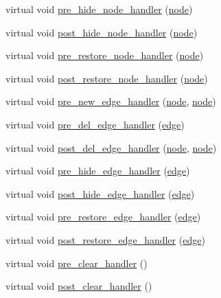 \begin{DoxyCompactItemize}
\item 
virtual void \mbox{\hyperlink{classgraph_ac169b1dca0b01c97e683302b3908fd49}{pre\+\_\+hide\+\_\+node\+\_\+handler}} (\mbox{\hyperlink{classnode}{node}})
\item 
virtual void \mbox{\hyperlink{classgraph_a50cb72a1e81d0a3d68965a1e6070edb3}{post\+\_\+hide\+\_\+node\+\_\+handler}} (\mbox{\hyperlink{classnode}{node}})
\item 
virtual void \mbox{\hyperlink{classgraph_a3a305d240ab5237a2adae315b50105a6}{pre\+\_\+restore\+\_\+node\+\_\+handler}} (\mbox{\hyperlink{classnode}{node}})
\item 
virtual void \mbox{\hyperlink{classgraph_a2d555506de6aa30bb981f0b60375762d}{post\+\_\+restore\+\_\+node\+\_\+handler}} (\mbox{\hyperlink{classnode}{node}})
\item 
virtual void \mbox{\hyperlink{classgraph_a0a7a68fa0baa47ef955525c445fa1a04}{pre\+\_\+new\+\_\+edge\+\_\+handler}} (\mbox{\hyperlink{classnode}{node}}, \mbox{\hyperlink{classnode}{node}})
\item 
virtual void \mbox{\hyperlink{classgraph_a2cd0986dc5bcbfdbf0635c39e610784b}{pre\+\_\+del\+\_\+edge\+\_\+handler}} (\mbox{\hyperlink{classedge}{edge}})
\item 
virtual void \mbox{\hyperlink{classgraph_ab9ac8bcc7288986de69cd467beb33600}{post\+\_\+del\+\_\+edge\+\_\+handler}} (\mbox{\hyperlink{classnode}{node}}, \mbox{\hyperlink{classnode}{node}})
\item 
virtual void \mbox{\hyperlink{classgraph_aa33201befa6ad7433becd7424d6de55b}{pre\+\_\+hide\+\_\+edge\+\_\+handler}} (\mbox{\hyperlink{classedge}{edge}})
\item 
virtual void \mbox{\hyperlink{classgraph_ad4614e74a125054eb3e180f6f32ab7bb}{post\+\_\+hide\+\_\+edge\+\_\+handler}} (\mbox{\hyperlink{classedge}{edge}})
\item 
virtual void \mbox{\hyperlink{classgraph_a569d227d9f4914278a143d52139e3303}{pre\+\_\+restore\+\_\+edge\+\_\+handler}} (\mbox{\hyperlink{classedge}{edge}})
\item 
virtual void \mbox{\hyperlink{classgraph_adfc71011ae82f047c550eba6d9e7bb3a}{post\+\_\+restore\+\_\+edge\+\_\+handler}} (\mbox{\hyperlink{classedge}{edge}})
\item 
virtual void \mbox{\hyperlink{classgraph_a16ccad78837d16be59854549cd2d847a}{pre\+\_\+clear\+\_\+handler}} ()
\item 
virtual void \mbox{\hyperlink{classgraph_a870633528590b7925cd27776bdd2bbd2}{post\+\_\+clear\+\_\+handler}} ()
\item 

\end{DoxyCompactItemize}
